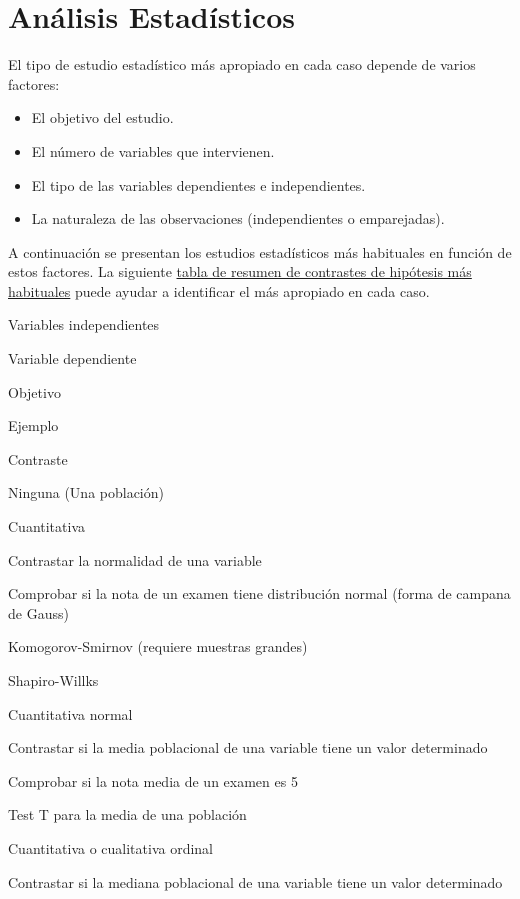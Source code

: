 \documentclass[
  a4paper,
]{scrreport}
\providecommand{\tightlist}{%
  \setlength{\itemsep}{0pt}\setlength{\parskip}{0pt}}\usepackage{longtable,booktabs,array}
\theoremstyle{definition}
\theoremstyle{definition}
\theoremstyle{remark}
\begin{document}

\hypertarget{anuxe1lisis-estaduxedsticos}{%
\chapter{Análisis Estadísticos}\label{anuxe1lisis-estaduxedsticos}}

El tipo de estudio estadístico más apropiado en cada caso depende de
varios factores:

\begin{itemize}
\tightlist
\item
  El objetivo del estudio.
\item
  El número de variables que intervienen.
\item
  El tipo de las variables dependientes e independientes.
\item
  La naturaleza de las observaciones (independientes o emparejadas).
\end{itemize}

A continuación se presentan los estudios estadísticos más habituales en
función de estos factores. La siguiente
\href{tablas/Tabla\%20Resumen\%20Contraste\%20de\%20Hip\%C3\%B3tesis.pdf}{tabla
de resumen de contrastes de hipótesis más habituales} puede ayudar a
identificar el más apropiado en cada caso.

Variables independientes

Variable dependiente

Objetivo

Ejemplo

Contraste

Ninguna (Una población)

Cuantitativa

Contrastar la normalidad de una variable

Comprobar si la nota de un examen tiene distribución normal (forma de
campana de Gauss)

Komogorov-Smirnov (requiere muestras grandes)

Shapiro-Willks

Cuantitativa normal

Contrastar si la media poblacional de una variable tiene un valor
determinado

Comprobar si la nota media de un examen es 5

Test T para la media de una población

Cuantitativa o cualitativa ordinal

Contrastar si la mediana poblacional de una variable tiene un valor
determinado
\end{document}

